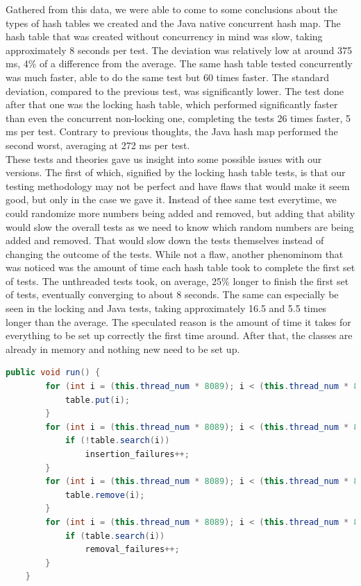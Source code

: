 \documentclass[conference]{IEEEtran}
\begin{document}
Gathered from this data, we were able to come to some conclusions about the types of hash tables we created and the Java native concurrent hash map.
The hash table that was created without concurrency in mind was slow, taking approximately 8 seconds per test. The deviation was relatively low at around 375 ms, 4\% of a difference from the average.
The same hash table tested concurrently was much faster, able to do the same test but 60 times faster. The standard deviation, compared to the previous test, was significantly lower. 
The test done after that one was the locking hash table, which performed significantly faster than even the concurrent non-locking one, completing the tests 26 times faster, 5 ms per test. 
Contrary to previous thoughts, the Java hash map performed the second worst, averaging at 272 ms per test. \\
These tests and theories gave us insight into some possible issues with our versions.
The first of which, signified by the locking hash table tests, is that our testing methodology may not be perfect and have flaws that would make it seem good, but only in the case we gave it.
Instead of thee same test everytime, we could randomize more numbers being added and removed, but adding that ability would slow the overall tests as we need to know which random numbers are being added and removed.
That would slow down the tests themselves instead of changing the outcome of the tests. 
While not a flaw, another phenominom that was noticed was the amount of time each hash table took to complete the first set of tests. 
The unthreaded tests took, on average, 25\% longer to finish the first set of tests, eventually converging to about 8 seconds.
The same can especially be seen in the locking and Java tests, taking approximately 16.5 and 5.5 times longer than the average.
The speculated reason is the amount of time it takes for everything to be set up correctly the first time around. After that, the classes are already in memory and nothing new need to be set up.

\begin{lstlisting}[language={Java},caption=Source code for the experiment used in each test,captionpos=b,breaklines=true,frame=single]
    public void run() {
        for (int i = (this.thread_num * 8089); i < (this.thread_num * 8089) + 8089; i++) {
            table.put(i);
        }
        for (int i = (this.thread_num * 8089); i < (this.thread_num * 8089) + 8089; i++) {
            if (!table.search(i))
                insertion_failures++;
        }
        for (int i = (this.thread_num * 8089); i < (this.thread_num * 8089) + 8089; i++) {
            table.remove(i);
        }
        for (int i = (this.thread_num * 8089); i < (this.thread_num * 8089) + 8089; i++) {
            if (table.search(i))
                removal_failures++;
        }
    }
\end{lstlisting}
\end{document}
